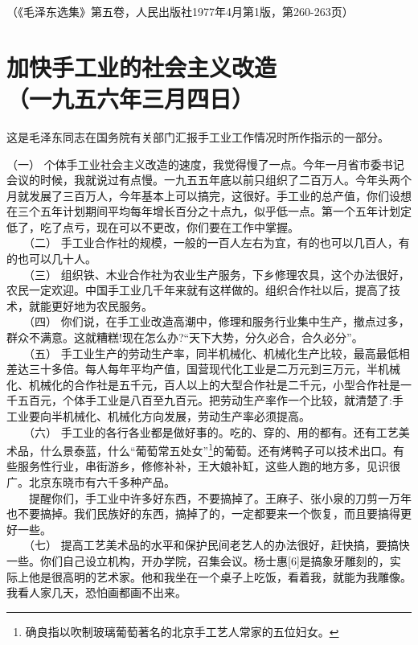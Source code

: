\documentclass[cn,11pt,chinese]{elegantbook}
\def\myformat#1{\hfil\hfil #1}
\begin{document}
\begin{flushright}（《毛泽东选集》第五卷，人民出版社1977年4月第1版，第260-263页）\end{flushright}
\newpage\section*{\myformat{加快手工业的社会主义改造}\\\myformat{（一九五六年三月四日）}}
\begin{introduction}\item  这是毛泽东同志在国务院有关部门汇报手工业工作情况时所作指示的一部分。\end{introduction}
（一） 个体手工业社会主义改造的速度，我觉得慢了一点。今年一月省市委书记会议的时候，我就说过有点慢。一九五五年底以前只组织了二百万人。今年头两个月就发展了三百万人，今年基本上可以搞完，这很好。手工业的总产值，你们设想在三个五年计划期间平均每年增长百分之十点九，似乎低一点。第一个五年计划定低了，吃了点亏，现在可以不更改，你们要在工作中掌握。\\
　　（二） 手工业合作社的规模，一般的一百人左右为宜，有的也可以几百人，有的也可以几十人。\\
　　（三） 组织铁、木业合作社为农业生产服务，下乡修理农具，这个办法很好，农民一定欢迎。中国手工业几千年来就有这样做的。组织合作社以后，提高了技术，就能更好地为农民服务。\\
　　（四） 你们说，在手工业改造高潮中，修理和服务行业集中生产，撤点过多，群众不满意。这就糟糕!现在怎么办?“天下大势，分久必合，合久必分”。\\
　　（五） 手工业生产的劳动生产率，同半机械化、机械化生产比较，最高最低相差达三十多倍。每人每年平均产值，国营现代化工业是二万元到三万元，半机械化、机械化的合作社是五千元，百人以上的大型合作社是二千元，小型合作社是一千五百元，个体手工业是八百至九百元。把劳动生产率作一个比较，就清楚了:手工业要向半机械化、机械化方向发展，劳动生产率必须提高。\\
　　（六） 手工业的各行各业都是做好事的。吃的、穿的、用的都有。还有工艺美术品，什么景泰蓝，什么“葡萄常五处女”\footnote[1]{确良指以吹制玻璃葡萄著名的北京手工艺人常家的五位妇女。}的葡萄。还有烤鸭子可以技术出口。有些服务性行业，串街游乡，修修补补，王大娘补缸，这些人跑的地方多，见识很广。北京东晓市有六千多种产品。\\
　　提醒你们，手工业中许多好东西，不要搞掉了。王麻子、张小泉的刀剪一万年也不要搞掉。我们民族好的东西，搞掉了的，一定都要来一个恢复，而且要搞得更好一些。\\
　　（七） 提高工艺美术品的水平和保护民间老艺人的办法很好，赶快搞，要搞快一些。你们自己设立机构，开办学院，召集会议。杨士惠[6]是搞象牙雕刻的，实际上他是很高明的艺术家。他和我坐在一个桌子上吃饭，看着我，就能为我雕像。我看人家几天，恐怕画都画不出来。\\
\end{document}
